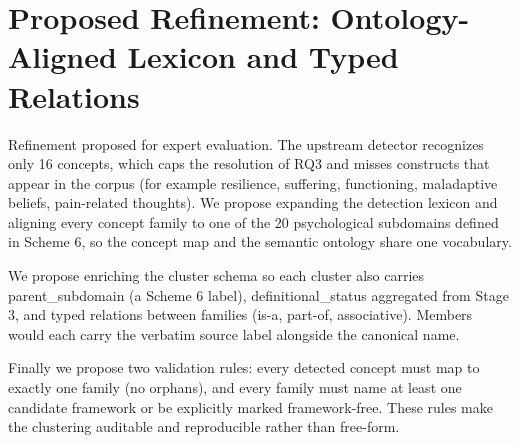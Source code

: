 \documentclass[11pt]{article}
\begin{document}
\section*{Proposed Refinement: Ontology-Aligned Lexicon and Typed Relations}
Refinement proposed for expert evaluation. The upstream detector recognizes only 16 concepts, which caps the resolution of RQ3 and misses constructs that appear in the corpus (for example resilience, suffering, functioning, maladaptive beliefs, pain-related thoughts). We propose expanding the detection lexicon and aligning every concept family to one of the 20 psychological subdomains defined in Scheme 6, so the concept map and the semantic ontology share one vocabulary.

We propose enriching the cluster schema so each cluster also carries parent\_subdomain (a Scheme 6 label), definitional\_status aggregated from Stage 3, and typed relations between families (is-a, part-of, associative). Members would each carry the verbatim source label alongside the canonical name.

Finally we propose two validation rules: every detected concept must map to exactly one family (no orphans), and every family must name at least one candidate framework or be explicitly marked framework-free. These rules make the clustering auditable and reproducible rather than free-form.
\end{document}
